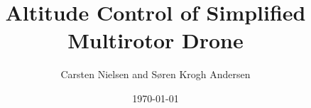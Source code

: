 



\title{Altitude Control of Simplified Multirotor Drone}
\author{Carsten Nielsen and Søren Krogh Andersen}
\date{\today}
\maketitle












